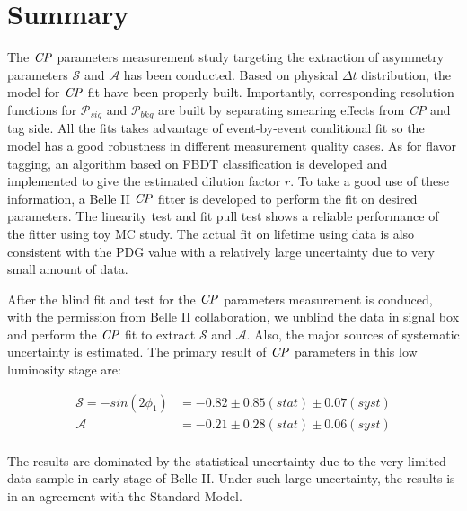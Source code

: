 \section{Summary}
The $\it{CP}$ parameters measurement study targeting the extraction of asymmetry parameters $\mathcal{S}$ and $\mathcal{A}$ has been conducted. Based on physical $\Delta t$ distribution, the model for $\it{CP}$ fit have been properly built. Importantly, corresponding resolution functions for $\mathcal{P}_{sig}$ and $\mathcal{P}_{bkg}$ are built by separating smearing effects from \textit{CP} and tag side. All the fits takes advantage of event-by-event conditional fit so the model has a good robustness in different measurement quality cases. As for flavor tagging, an algorithm based on FBDT classification is developed and implemented to give the estimated dilution factor $r$. To take a good use of these information, a Belle II $\it{CP}$ fitter is developed to perform the fit on desired parameters. The linearity test and fit pull test shows a reliable performance of the fitter using toy MC study. The actual fit on lifetime using data is also consistent with the PDG value with a relatively large uncertainty due to very small amount of data. 

After the blind fit and test for the $\it{CP}$ parameters measurement is conduced, with the permission from Belle II collaboration, we unblind the data in signal box and perform the $\it{CP}$ fit to extract $\mathcal{S}$ and $\mathcal{A}$. Also, the major sources of systematic uncertainty is estimated. The primary result of $\it{CP}$ parameters in this low luminosity stage are:

\begin{equation}
\begin{split}
\mathcal{S}=- sin(2\phi_1) & = -0.82 \pm 0.85(stat) \pm 0.07(syst) \\
\mathcal{A} & = -0.21\pm 0.28(stat) \pm 0.06(syst)\\
\end{split}
\end{equation}  

The results are dominated by the statistical uncertainty due to the very limited data sample in early stage of Belle II. Under such large uncertainty, the results is in an agreement with the Standard Model. 
